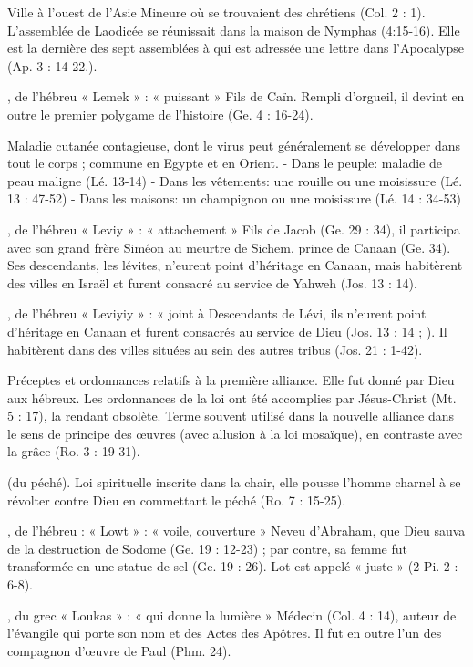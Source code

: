 \begin{multicols}{2}
Ville à l'ouest de l'Asie Mineure où se trouvaient des chrétiens (Col. 2 : 1). L'assemblée de Laodicée se réunissait dans la maison de Nymphas (4:15-16). Elle est la dernière des sept assemblées à qui est adressée une lettre dans l'Apocalypse (Ap. 3 : 14-22.).


, de l'hébreu « Lemek » : « puissant »
Fils de Caïn. Rempli d'orgueil, il devint en outre le premier polygame de l'histoire (Ge. 4 : 16-24).


Maladie cutanée contagieuse, dont le virus peut généralement se développer dans tout le corps ; commune en Egypte et en Orient.
- Dans le peuple: maladie de peau maligne (Lé. 13-14)
- Dans les vêtements: une rouille ou une moisissure (Lé. 13 : 47-52)
- Dans les maisons: un champignon ou une moisissure (Lé. 14 : 34-53)


, de l'hébreu « Leviy » : « attachement »
Fils de Jacob (Ge. 29 : 34), il participa avec son grand frère Siméon au meurtre de Sichem, prince de Canaan (Ge. 34). Ses descendants, les lévites, n'eurent point d'héritage en Canaan, mais habitèrent des villes en Israël et furent consacré au service de Yahweh (Jos. 13 : 14).


, de l'hébreu « Leviyiy » : « joint à
Descendants de Lévi, ils n'eurent point d'héritage en Canaan et furent consacrés au service de Dieu (Jos. 13 : 14 ; ). Il habitèrent dans des villes situées au sein des autres tribus (Jos. 21 : 1-42).


Préceptes et ordonnances relatifs à la première alliance. Elle fut donné par Dieu aux hébreux. Les ordonnances de la loi ont été accomplies par Jésus-Christ (Mt. 5 : 17), la rendant obsolète. Terme souvent utilisé dans la nouvelle alliance dans le sens de principe des œuvres (avec allusion à la loi mosaïque), en contraste avec la grâce (Ro. 3 : 19-31).


(du péché).
Loi spirituelle inscrite dans la chair, elle pousse l'homme charnel à se révolter contre Dieu en commettant le péché (Ro. 7 : 15-25).


, de l'hébreu : « Lowt » : « voile, couverture »
Neveu d'Abraham, que Dieu sauva de la destruction de Sodome (Ge. 19 : 12-23) ; par contre, sa femme fut transformée en une statue de sel (Ge. 19 : 26). Lot est appelé « juste » (2 Pi. 2 : 6-8).


, du grec « Loukas » : « qui donne la lumière »
Médecin (Col. 4 : 14), auteur de l'évangile qui porte son nom et des Actes des Apôtres. Il fut en outre l'un des compagnon d'œuvre de Paul (Phm. 24).



\end{multicols}
